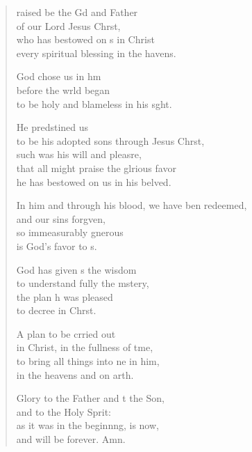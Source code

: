 \begin{verse}
  \begin{patverse}
    raised be the Gd and Father\Med\\
    of our Lord Jesus Chr\pointup{\i}st,\\
    who has bestowed on s in Christ\Med\\
    every spiritual blessing in the havens.
    
    God chose us in h\pointup{\i}m\Flex\\
    before the wrld began\Med\\
    to be holy and blameless in his s\pointup{\i}ght.
    
    He predstined us\Med\\
    to be his adopted sons through Jesus Chr\pointup{\i}st,\Med\\
    such was his will and pleasre,\Flex\\
    that all might praise the glrious favor\Med\\
    he has bestowed on us in his belved.
    
    In him and through his blood, we have ben redeemed,\Med\\
    and our sins forg\pointup{\i}ven,\\
    so immeasurably gnerous\Med\\
    is God’s favor to s.
    
    God has given s the wisdom\Med\\
    to understand fully the mstery,\\
    the plan h was pleased\Med\\
    to decree in Chr\pointup{\i}st.
    
    A plan to be crried out\Med\\
    in Christ, in the fullness of t\pointup{\i}me,\\
    to bring all things into ne in him,\Med\\
    in the heavens and on arth.
    
    Glory to the Father and t the Son,\Med\\
    and to the Holy Sp\pointup{\i}rit:\\
    as it was in the beginn\pointup{\i}ng, is now,\Med\\
    and will be forever. Amn.
  \end{patverse}
\end{verse}
